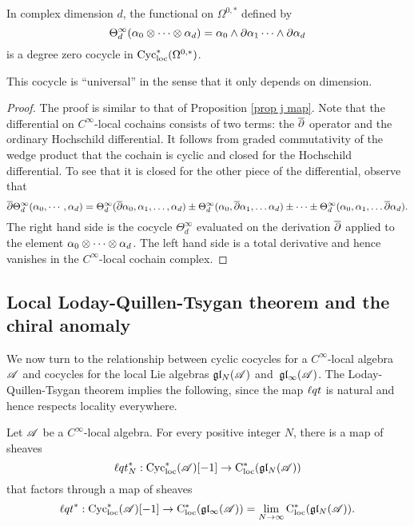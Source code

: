 \begin{lem}
\label{lem: univ}
In complex dimension $d$, 
the functional on $\Omega^{0,*}$ defined by
\[
\Theta^\infty_d (\alpha_0 \otimes \cdots \otimes \alpha_d) = \alpha_0 \wedge \partial \alpha_1 \cdots \wedge \partial \alpha_d
\]
is a degree zero cocycle in ${\rm Cyc}_{\rm loc}^*(\Omega^{0,*})$. 
\end{lem}

This cocycle is ``universal'' in the sense that it only depends on dimension.

\begin{proof}
The proof is similar to that of Proposition \ref{prop j map}. 
Note that the differential on $C^\infty$-local cochains consists of two terms: the $\overline{\partial}$ operator and the ordinary Hochschild differential. 
It follows from graded commutativity of the wedge product that the cochain is cyclic and closed for the Hochschild differential. 
To see that it is closed for the other piece of the differential, observe that
\[
\overline{\partial} \Theta^\infty_d(\alpha_0,\cdots,\alpha_d) = \Theta^\infty_d(\overline{\partial} \alpha_0, \alpha_1,\ldots,\alpha_d) \pm \Theta_d^\infty(\alpha_0, \overline{\partial} \alpha_1,\ldots \alpha_d) \pm \cdots \pm \Theta_d^\infty(\alpha_0, \alpha_1,\ldots \overline{\partial} \alpha_d) .
\]
The right hand side is the cocycle $\Theta_d^\infty$ evaluated on the derivation $\overline{\partial}$ applied to the element $\alpha_0 \otimes \cdots \otimes \alpha_d$. 
The left hand side is a total derivative and hence vanishes in the $C^\infty$-local cochain complex. 
\end{proof}

\subsection{Local Loday-Quillen-Tsygan theorem and the chiral anomaly}

We now turn to the relationship between cyclic cocycles for a $C^\infty$-local algebra $\mathscr A$ and cocycles for the local Lie algebras $\mathfrak{g} \mathfrak{l}_N( \mathscr A)$ and~$\mathfrak{g} \mathfrak{l}_\infty (\mathscr A)$.
The Loday-Quillen-Tsygan theorem implies the following,
since the map ${\ell q t}$ is natural and hence respects locality everywhere.

\begin{prop}
\label{prop: cycloc}
Let $\mathscr A$ be a $C^\infty$-local algebra.
For every positive integer $N$, there is a map of sheaves
\[
{\ell q t}_N^* : {\rm Cyc}_{\rm loc}^*(\mathscr A)[-1] \to {\rm C}_{\rm loc}^*(\mathfrak{g} \mathfrak{l}_N( \mathscr A)) 
\] 
that factors through a map of sheaves
\[
{\ell q t}^* : {\rm Cyc}_{\rm loc}^*(\mathscr A)[-1] \to {\rm C}_{\rm loc}^*(\mathfrak{g} \mathfrak{l}_\infty( \mathscr A)) = \lim_{N \to \infty} {\rm C}_{\rm loc}^*(\mathfrak{g} \mathfrak{l}_N( \mathscr A))  .
\]
\end{prop}

